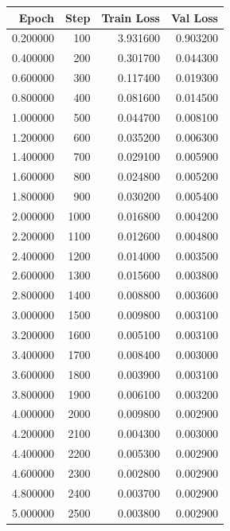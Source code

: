 \begin{tabular}{rrrr}
\toprule
Epoch & Step & Train Loss & Val Loss \\
\midrule
0.200000 & 100 & 3.931600 & 0.903200 \\
0.400000 & 200 & 0.301700 & 0.044300 \\
0.600000 & 300 & 0.117400 & 0.019300 \\
0.800000 & 400 & 0.081600 & 0.014500 \\
1.000000 & 500 & 0.044700 & 0.008100 \\
1.200000 & 600 & 0.035200 & 0.006300 \\
1.400000 & 700 & 0.029100 & 0.005900 \\
1.600000 & 800 & 0.024800 & 0.005200 \\
1.800000 & 900 & 0.030200 & 0.005400 \\
2.000000 & 1000 & 0.016800 & 0.004200 \\
2.200000 & 1100 & 0.012600 & 0.004800 \\
2.400000 & 1200 & 0.014000 & 0.003500 \\
2.600000 & 1300 & 0.015600 & 0.003800 \\
2.800000 & 1400 & 0.008800 & 0.003600 \\
3.000000 & 1500 & 0.009800 & 0.003100 \\
3.200000 & 1600 & 0.005100 & 0.003100 \\
3.400000 & 1700 & 0.008400 & 0.003000 \\
3.600000 & 1800 & 0.003900 & 0.003100 \\
3.800000 & 1900 & 0.006100 & 0.003200 \\
4.000000 & 2000 & 0.009800 & 0.002900 \\
4.200000 & 2100 & 0.004300 & 0.003000 \\
4.400000 & 2200 & 0.005300 & 0.002900 \\
4.600000 & 2300 & 0.002800 & 0.002900 \\
4.800000 & 2400 & 0.003700 & 0.002900 \\
5.000000 & 2500 & 0.003800 & 0.002900 \\
\bottomrule
\end{tabular}
